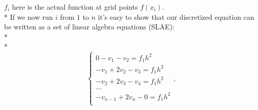\documentclass[10pt]{article}
\begin{document}
 $f_i$ here is the actual function at grid points $f(x_i)$. \\* 
 If we now run $ i $ from $ 1 $ to $ n $ it's easy to show that our discretized equation can be written as a set of linear algebra equations (SLAE):
 \\* 
  \\* 
\begin{equation}
\begin{cases}
0 - v_{1}-v_{2} = f_1h^2 \\ -v_{1}+2v_{2}-v_{3} = f_1h^2  \\ 
-v_{2}+2v_{3}-v_{4} = f_1h^2  \\ \dots  \\ -v_{n-1}+2v_{n}-0= f_1h^2 \\
\end{cases},
\end{equation}
\end{document}
